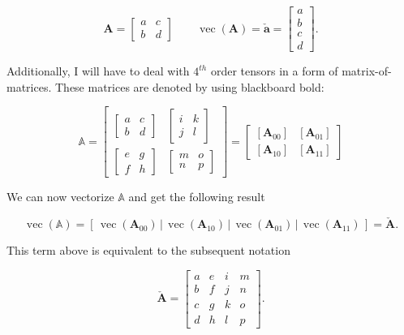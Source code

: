 \[
\mathbf{A} = \begin{bmatrix} a & c \\ b & d \end{bmatrix} \qquad \operatorname{vec}(\mathbf{A}) = \mathbf{\check{a}} = \begin{bmatrix} a \\ b \\ c \\ d \end{bmatrix}.
\]

Additionally, I will have to deal with $4^{th}$ order tensors in a form of matrix-of-matrices. These matrices are denoted by using blackboard bold:

\[
\mathbb{A} = 
\left[\begin{array}{cc}{\begin{bmatrix} a & c \\ b & d \end{bmatrix}} & {\begin{bmatrix} i & k \\ j & l \end{bmatrix}} \\ {\begin{bmatrix} e & g \\ f & h \end{bmatrix}} & {\begin{bmatrix} m & o \\ n & p \end{bmatrix}}\end{array}\right]
=
\left[\begin{array}{cc}{\left[\mathbf{A}_{00}\right]} & {\left[\mathbf{A}_{01}\right]} \\ {\left[\mathbf{A}_{10}\right]} & {\left[\mathbf{A}_{11}\right]}\end{array}\right]
\]

We can now vectorize $\mathbb{A}$ and get the following result

\[
\operatorname{vec}(\mathbb{A}) = \left[ \,\operatorname{vec}\left(\mathbf{A}_{00}\right)\, \bigg| \,\operatorname{vec}\left(\mathbf{A}_{10}\right)\, \bigg| \,\operatorname{vec}\left(\mathbf{A}_{01}\right)\, \bigg| \,\operatorname{vec}\left(\mathbf{A}_{11}\right)\, \right] = \mathbf{\check{A}}.
\]

This term above is equivalent to the subsequent notation

\[
\mathbf{\check{A}}=\left[\begin{array}{llll}{a} & {e} & {i} & {m} \\ {b} & {f} & {j} & {n} \\ {c} & {g} & {k} & {o} \\ {d} & {h} & {l} & {p}\end{array}\right].
\]

